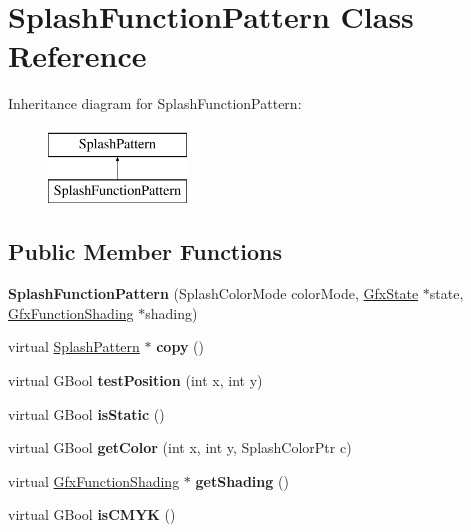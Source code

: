 \hypertarget{class_splash_function_pattern}{}\section{Splash\+Function\+Pattern Class Reference}
\label{class_splash_function_pattern}
Inheritance diagram for Splash\+Function\+Pattern\+:\begin{figure}[H]
\begin{center}
\leavevmode
\includegraphics[height=2.000000cm]{class_splash_function_pattern}
\end{center}
\end{figure}
\subsection*{Public Member Functions}
\begin{DoxyCompactItemize}
\item 
\mbox{\label{class_splash_function_pattern_a5a93ee27888c0ade046516c83418e0e3}} 
{\bfseries Splash\+Function\+Pattern} (Splash\+Color\+Mode color\+Mode, \hyperlink{class_gfx_state}{Gfx\+State} $\ast$state, \hyperlink{class_gfx_function_shading}{Gfx\+Function\+Shading} $\ast$shading)
\item 
\mbox{\label{class_splash_function_pattern_a8a9dc832011744e206e90701541cfcdb}} 
virtual \hyperlink{class_splash_pattern}{Splash\+Pattern} $\ast$ {\bfseries copy} ()
\item 
\mbox{\label{class_splash_function_pattern_a02e6c4a4cf61342f155b9bc8f3e4cfcb}} 
virtual G\+Bool {\bfseries test\+Position} (int x, int y)
\item 
\mbox{\label{class_splash_function_pattern_a9c11b6b373598f5f8b534cb25f7fd41d}} 
virtual G\+Bool {\bfseries is\+Static} ()
\item 
\mbox{\label{class_splash_function_pattern_abb94700f822ea30377f7045c9ff197f6}} 
virtual G\+Bool {\bfseries get\+Color} (int x, int y, Splash\+Color\+Ptr c)
\item 
\mbox{\label{class_splash_function_pattern_a48428f82687aa8bf3288823dca23c9eb}} 
virtual \hyperlink{class_gfx_function_shading}{Gfx\+Function\+Shading} $\ast$ {\bfseries get\+Shading} ()
\item 
\mbox{\label{class_splash_function_pattern_a12c76aec27f3de94ce2e098c602b140d}} 
virtual G\+Bool {\bfseries is\+C\+M\+YK} ()
\end{DoxyCompactItemize}
